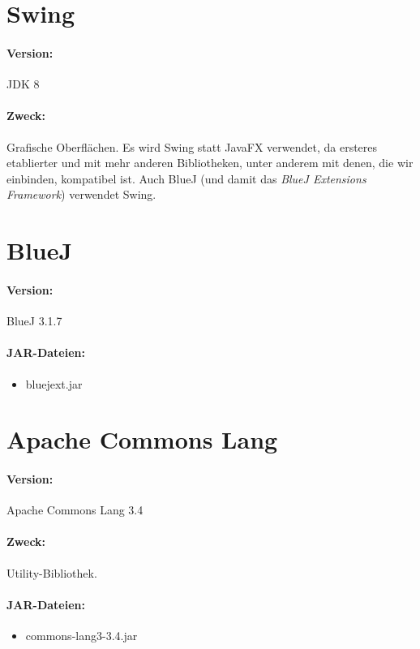 \documentclass[a4paper]{report}
\begin{document}
\section{Swing}
\paragraph{Version:} JDK 8 \\
\paragraph{Zweck:} Grafische Oberflächen. Es wird Swing statt JavaFX verwendet, da ersteres etablierter und mit mehr anderen Bibliotheken, unter anderem mit denen, die wir einbinden, kompatibel ist. Auch BlueJ (und damit das \emph{BlueJ Extensions Framework}) verwendet Swing.

\section{BlueJ}
\paragraph{Version:} BlueJ 3.1.7 \\
\paragraph{JAR-Dateien:}
	\begin{itemize}
	\item bluejext.jar\\
\end{itemize}

\section{Apache Commons Lang}
\paragraph{Version:} Apache Commons Lang 3.4 \\
\paragraph{Zweck:} Utility-Bibliothek. \\
\paragraph{JAR-Dateien:}
	\begin{itemize}
	\item commons-lang3-3.4.jar
	\end{itemize}
\end{document}
